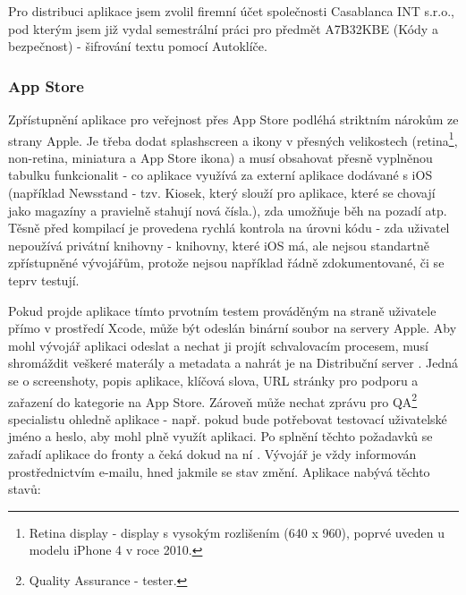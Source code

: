 Pro distribuci aplikace jsem zvolil firemní účet společnosti Casablanca INT s.r.o., pod kterým jsem již vydal semestrální práci pro předmět A7B32KBE (Kódy a bezpečnost) - šifrování textu pomocí Autoklíče.

\subsubsection*{App Store}
Zpřístupnění aplikace pro veřejnost přes App Store podléhá striktním nárokům ze strany Apple. Je třeba dodat splashscreen a ikony v přesných velikostech (retina\footnote{Retina display - display s vysokým rozlišením (640 x 960), poprvé uveden u modelu iPhone 4 v roce 2010.}, non-retina, miniatura a App Store ikona) a musí obsahovat přesně vyplněnou tabulku funkcionalit - co aplikace využívá za externí aplikace dodávané s iOS (například Newsstand - tzv. Kiosek, který slouží pro aplikace, které se chovají jako magazíny a pravielně stahují nová čísla.), zda umožňuje běh na pozadí atp. Těsně před kompilací je provedena rychlá kontrola na úrovni kódu - zda uživatel nepoužívá privátní knihovny - knihovny, které iOS má, ale nejsou standartně zpřístupněné vývojářům, protože nejsou například řádně zdokumentované, či se teprv testují.

Pokud projde aplikace tímto prvotním testem prováděným na straně uživatele přímo v prostředí Xcode, může být odeslán binární soubor na servery Apple. Aby mohl vývojář aplikaci odeslat a nechat ji projít schvalovacím procesem, musí shromáždit veškeré materály a metadata a nahrát je na Distribuční server \cite{DISTRO}. Jedná se o screenshoty, popis aplikace, klíčová slova, URL stránky pro podporu a zařazení do kategorie na App Store. Zároveň může nechat zprávu pro QA\footnote{Quality Assurance - tester.} specialistu ohledně aplikace - např. pokud bude potřebovat testovací uživatelské jméno a heslo, aby mohl plně využít aplikaci. Po splnění těchto požadavků se zařadí aplikace do fronty a čeká dokud na ní . Vývojář je vždy informován prostřednictvím e-mailu, hned jakmile se stav změní. Aplikace nabývá těchto stavů:

